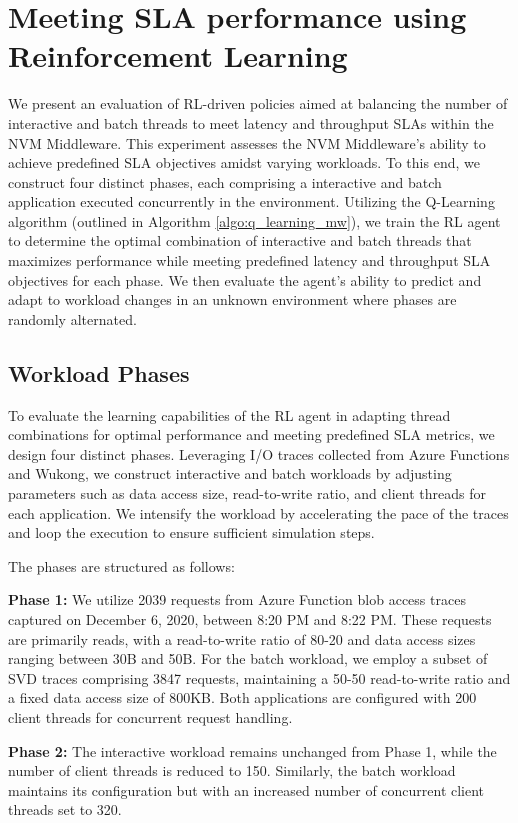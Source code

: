 \section{Meeting SLA performance using Reinforcement Learning}

We present an evaluation of RL-driven policies aimed at balancing the number of interactive and batch threads to meet latency and throughput SLAs within the NVM Middleware. This experiment assesses the NVM Middleware's ability to achieve predefined SLA objectives amidst varying workloads. To this end, we construct four distinct phases, each comprising a interactive and batch application executed concurrently in the environment. Utilizing the Q-Learning algorithm (outlined in Algorithm \ref{algo:q_learning_mw}), we train the RL agent to determine the optimal combination of interactive and batch threads that maximizes performance while meeting predefined latency and throughput SLA objectives for each phase. We then evaluate the agent's ability to predict and adapt to workload changes in an unknown environment where phases are randomly alternated.

\subsection*{Workload Phases}

To evaluate the learning capabilities of the RL agent in adapting thread combinations for optimal performance and meeting predefined SLA metrics, we design four distinct phases. Leveraging I/O traces collected from Azure Functions and Wukong, we construct interactive and batch workloads by adjusting parameters such as data access size, read-to-write ratio, and client threads for each application. We intensify the workload by accelerating the pace of the traces and loop the execution to ensure sufficient simulation steps.

The phases are structured as follows:

\textbf{Phase 1:} We utilize 2039 requests from Azure Function blob access traces captured on December 6, 2020, between 8:20 PM and 8:22 PM. These requests are primarily reads, with a read-to-write ratio of 80-20 and data access sizes ranging between 30B and 50B. For the batch workload, we employ a subset of SVD traces comprising 3847 requests, maintaining a 50-50 read-to-write ratio and a fixed data access size of 800KB. Both applications are configured with 200 client threads for concurrent request handling.

\textbf{Phase 2:} The interactive workload remains unchanged from Phase 1, while the number of client threads is reduced to 150. Similarly, the batch workload maintains its configuration but with an increased number of concurrent client threads set to 320.

